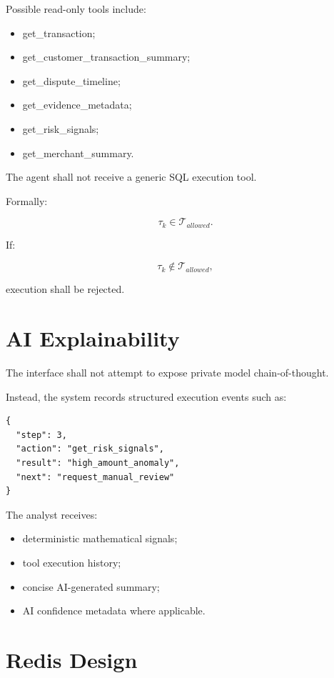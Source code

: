 \documentclass[11pt,a4paper]{article}
\begin{document}
Possible read-only tools include:

\begin{itemize}
    \item get\_transaction;
    \item get\_customer\_transaction\_summary;
    \item get\_dispute\_timeline;
    \item get\_evidence\_metadata;
    \item get\_risk\_signals;
    \item get\_merchant\_summary.
\end{itemize}

The agent shall not receive a generic SQL execution tool.

Formally:

\[
\tau_k
\in
\mathcal{T}_{allowed}.
\]

If:

\[
\tau_k
\notin
\mathcal{T}_{allowed},
\]

execution shall be rejected.

\section{AI Explainability}

The interface shall not attempt to expose private model chain-of-thought.

Instead, the system records structured execution events such as:

\begin{lstlisting}
{
  "step": 3,
  "action": "get_risk_signals",
  "result": "high_amount_anomaly",
  "next": "request_manual_review"
}
\end{lstlisting}

The analyst receives:

\begin{itemize}
    \item deterministic mathematical signals;
    \item tool execution history;
    \item concise AI-generated summary;
    \item AI confidence metadata where applicable.
\end{itemize}

\section{Redis Design}
\end{document}
